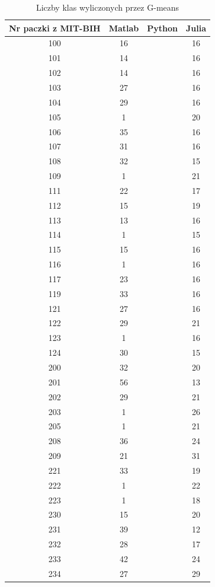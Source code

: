 \begin{table}[!tp]
	\centering
	\caption{Liczby klas wyliczonych przez G-means}
	\label{tabResults2}
	\begin{tabular}{|c|c|c|c|}
		\hline
		Nr paczki z MIT-BIH & Matlab & Python & Julia\\ \hline		
		100 & 16 &  & 16\\ \hline
		101 & 14 &  & 16\\ \hline
		102 & 14 &  & 16\\ \hline
		103 & 27 &  & 16\\ \hline
		104 & 29 &  & 16\\ \hline
		105 &  1 &  & 20\\ \hline
		106 & 35 &  & 16\\ \hline
		107 & 31 &  & 16\\ \hline
		108 & 32 &  & 15\\ \hline
		109 &  1 &  & 21\\ \hline
		111 & 22 &  & 17\\ \hline
		112 & 15 &  & 19\\ \hline
		113 & 13 &  & 16\\ \hline
		114 &  1 &  & 15\\ \hline
		115 & 15 &  & 16\\ \hline
		116 &  1 &  & 16\\ \hline
		117 & 23 &  & 16\\ \hline
		119 & 33 &  & 16\\ \hline
		121 & 27 &  & 16\\ \hline
		122 & 29 &  & 21\\ \hline
		123 &  1 &  & 16\\ \hline
		124 & 30 &  & 15\\ \hline
		200 & 32 &  & 20\\ \hline
		201 & 56 &  & 13\\ \hline
		202 & 29 &  & 21\\ \hline
		203 &  1 &  & 26\\ \hline
		205 &  1 &  & 21\\ \hline
		208 & 36 &  & 24\\ \hline
		209 & 21 &  & 31\\ \hline
		221 & 33 &  & 19\\ \hline
		222 &  1 &  & 22\\ \hline
		223 &  1 &  & 18\\ \hline
		230 & 15 &  & 20\\ \hline
		231 & 39 &  & 12\\ \hline
		232 & 28 &  & 17\\ \hline
		233 & 42 &  & 24\\ \hline
		234 & 27 &  & 29\\ \hline
	\end{tabular}
\end{table}


